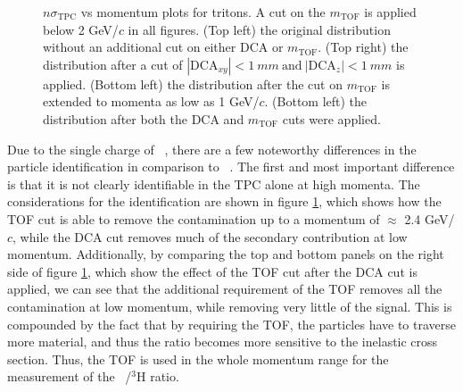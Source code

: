\begin{figure}
    \caption{$n\sigma_{\mathrm{TPC}}$ vs momentum plots for tritons. A cut on the $m_{\mathrm{TOF}}$ is applied below 2 GeV/$c$ in all figures. (Top left) the original distribution without an additional cut on either DCA or $m_{\mathrm{TOF}}$. (Top right) the distribution after a cut of $|\mathrm{DCA}_{xy}|<1\ mm\ \textrm{and}\  |\mathrm{DCA}_z|<1\ mm$ is applied. (Bottom left) the distribution after the cut on $m_{\mathrm{TOF}}$ is extended to momenta as low as 1 GeV/$c$. (Bottom left) the distribution after both the DCA and $m_{\mathrm{TOF}}$ cuts were applied.}
    \label{fig:Tritons_momentum_range}
\end{figure}
Due to the single charge of \atrit\ , there are a few noteworthy differences in the particle identification in comparison to \ahe\ . The first and most important difference is that it is not clearly identifiable in the TPC alone at high momenta. The considerations for the identification are shown in figure \ref{fig:Tritons_momentum_range}, which shows how the TOF cut is able to remove the contamination up to a momentum of $\approx$ 2.4 GeV/$c$, while the DCA cut removes much of the secondary contribution at low momentum. Additionally, by comparing the top and bottom panels on the right side of figure \ref{fig:Tritons_momentum_range}, which show the effect of the TOF cut after the DCA cut is applied, we can see that the additional requirement of the TOF removes all the contamination at low momentum, while removing very little of the signal. This is compounded by the fact that by requiring the TOF, the particles have to traverse more material, and thus the ratio becomes more sensitive to the inelastic cross section. Thus, the TOF is used in the whole momentum range for the measurement of the \atrit\ /$^3\mathrm{H}$ ratio. 


